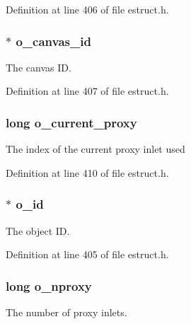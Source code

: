 Definition at line 406 of file estruct.\-h.

\hypertarget{struct__eobj_ab7f7ce6beaff87d1baca1a619b9a7ebf}{
\subsubsection[{o\-\_\-canvas\-\_\-id}]{$\ast$ o\-\_\-canvas\-\_\-id}}\label{struct__eobj_ab7f7ce6beaff87d1baca1a619b9a7ebf}
The canvas I\-D. 

Definition at line 407 of file estruct.\-h.

\hypertarget{struct__eobj_a32a8921c66d63fcccc9df035f6b9160f}{
\subsubsection[{o\-\_\-current\-\_\-proxy}]{\setlength{\rightskip}{0pt plus 5cm}long o\-\_\-current\-\_\-proxy}}\label{struct__eobj_a32a8921c66d63fcccc9df035f6b9160f}
The index of the current proxy inlet used 

Definition at line 410 of file estruct.\-h.

\hypertarget{struct__eobj_a024c5a2d6d2dcdf531f05a0e711cce68}{
\subsubsection[{o\-\_\-id}]{$\ast$ o\-\_\-id}}\label{struct__eobj_a024c5a2d6d2dcdf531f05a0e711cce68}
The object I\-D. 

Definition at line 405 of file estruct.\-h.

\hypertarget{struct__eobj_a5959b8f1e0726d2a7d82a4d39ae803bb}{
\subsubsection[{o\-\_\-nproxy}]{\setlength{\rightskip}{0pt plus 5cm}long o\-\_\-nproxy}}\label{struct__eobj_a5959b8f1e0726d2a7d82a4d39ae803bb}
The number of proxy inlets. 

